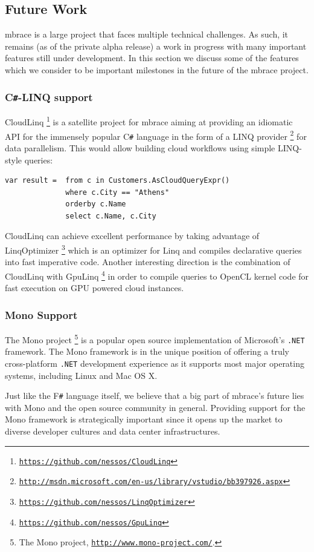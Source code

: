 \documentclass[9pt,a4paper]{article}
\newcommand{\mbrace}{mbrace}
\newcommand{\Mbrace}{\mbrace}
\newcommand{\fsharp}{F\texttt \#}
\newcommand{\csharp}{C\texttt \#}
\newcommand{\dotnet}{\texttt{\hbox{.}NET}}
\newcommand{\samehref}[1]{\href{#1}{\texttt{#1}}}
\begin{document}
\subsection*{Future Work}

\Mbrace{} is a large project that faces multiple technical challenges. As such,
it remains (as of the private alpha release) a work in progress with many important
features still under development. In this section we discuss some of the features
which we consider to be important milestones in the future of the \mbrace{} project.

\subsubsection*{\csharp{}-LINQ support}
CloudLinq%
\footnote{\samehref{https://github.com/nessos/CloudLinq}}
is a satellite project for \mbrace{} aiming at providing an idiomatic 
API for the immensely popular \csharp{} language in the
form of a LINQ provider%
\footnote{\samehref{http://msdn.microsoft.com/en-us/library/vstudio/bb397926.aspx}}
for data parallelism. This would allow building cloud workflows using simple
LINQ-style queries:
\begin{lstlisting}[language=CSharp]
var result =  from c in Customers.AsCloudQueryExpr()
			  where c.City == "Athens"
			  orderby c.Name
			  select c.Name, c.City
\end{lstlisting}
CloudLinq can achieve excellent performance by taking advantage of LinqOptimizer%
\footnote{\samehref{https://github.com/nessos/LinqOptimizer}}
which is an optimizer for Linq and compiles declarative queries into fast imperative code. Another interesting direction is the combination
of CloudLinq with GpuLinq%
\footnote{\samehref{https://github.com/nessos/GpuLinq}}
in order to compile queries to OpenCL kernel code for fast execution on GPU powered cloud instances.

\subsubsection*{Mono Support}

The Mono project%
\footnote{The Mono project, \samehref{http://www.mono-project.com/}.}
is a popular open source implementation of Microsoft's \dotnet{} framework.
The Mono framework is in the unique position of offering a truly cross-platform
\dotnet{} development experience as it supports most major operating systems,
including Linux and Mac OS X.

Just like the \fsharp{} language itself, we believe that a big part of \mbrace{}'s 
future lies with Mono and the open source community in general. Providing support
for the Mono framework is strategically important since it opens up the market
to diverse developer cultures and data center infrastructures.
\end{document}
